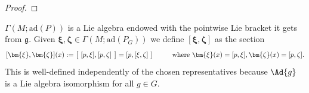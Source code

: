 \begin{proof}


\end{proof}

\begin{obs} \label{obs_def_bracket_sections}
    \(\Gamma(M; \mathrm{ad}(P))\) is a Lie algebra endowed with the pointwise Lie bracket it gets from \(\mathfrak{g}\). Given \(\bm{\xi}, \bm{\zeta}\in \Gamma(M; \mathrm{ad}(P_G))\) we define \([\bm{\xi}, \bm{\zeta}]\) as the section 
    \[
   [\bm{\xi}, \bm{\zeta}](x):= \big[\ [p, \xi], [p, \zeta] \ \big ]=[p, [\xi, \zeta]\ ] \hspace{1 cm} \text{where } \bm{\xi}(x)=[p, \xi], \bm{\zeta}(x)=[p, \zeta].
    \]
    This is well-defined independently of the chosen representatives because \(\Ad{g}\) is a Lie algebra isomorphism for all \(g \in G\).
\end{obs}

